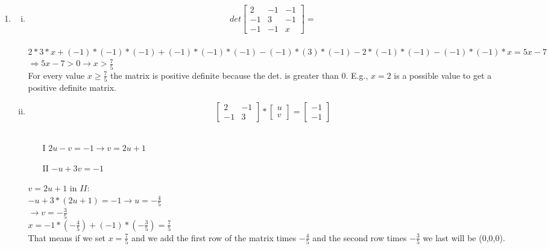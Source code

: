 \documentclass[12pt]{article}
\begin{document}
\begin{enumerate}[1)]
    \item
        \begin{enumerate}[(i)]
            \item 
                $$det\begin{bmatrix}2&-1&-1\\-1&3&-1\\-1&-1&x\end{bmatrix}=$$\\
                $2*3*x+(-1)*(-1)*(-1)+(-1)*(-1)*(-1)-(-1)*(3)*(-1)-2*(-1)*(-1)-(-1)*(-1)*x = 5x-7 $\\
                $\Rightarrow 5x-7 > 0 \rightarrow x> \frac{7}{5}$\\
                For every value $ x \geq \frac{7}{5}$ the matrix is positive definite because the det. is greater than 0. E.g., $x=2$ is a possible value to get a positive definite matrix.
            \item
               	 $$\begin{bmatrix}2&-1\\-1&3\end{bmatrix}* \begin{bmatrix} u \\v \end{bmatrix} = \begin{bmatrix} -1 \\-1 \end{bmatrix}$$\\
               	 \begin{enumerate}
               	 	\item[I] $2u-v=-1 \rightarrow v=2u+1$
               	 	\item[II] $-u+3v= -1 $
               	 \end{enumerate}
               	 $v=2u+1$ in $II$:\\
               	 $-u+3*(2u+1)=-1 \rightarrow u=-\frac{4}{5}$\\
               	 $\rightarrow v=-\frac{3}{5}$\\
               	 $x=-1*(-\frac{4}{5})+(-1)*(-\frac{3}{5}) = \frac{7}{5}$\\
               	 That means if we set $x=\frac{7}{5}$ and we add the first row of the matrix times $-\frac{4}{5}$ and the second row times $-\frac{3}{5}$ we last will be (0,0,0).
        \end{enumerate}


\end{enumerate}
\end{document}
